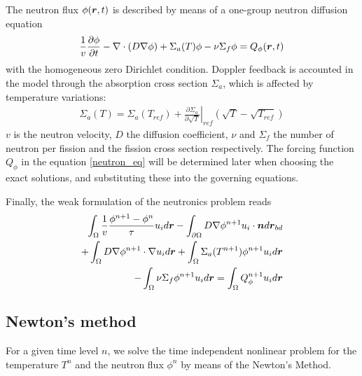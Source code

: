 The neutron flux $\phi(\boldsymbol{r},t)$ is described by means of a  one-group neutron diffusion equation
\begin{align}
  \frac{1}{v} \frac{\partial\phi}{\partial t} 
  - \nabla\cdot(D \nabla \phi) 
  + \Sigma_{a}(T) \phi 
  - \nu \Sigma_{f} \phi
  = Q_{\phi}(\boldsymbol{r},t) \label{neutron_eq}
\end{align}
%
with the homogeneous zero Dirichlet condition. Doppler feedback is accounted in the model through the absorption cross section $\Sigma_{a}$, which is affected by temperature variations:
\begin{align}
  \Sigma_{a}(T) = \Sigma_{a}(T_{ref}) 
  + \left. \frac{\partial \Sigma_{a}}{\partial \sqrt{T}}\right|_{ref} 
    \left( \sqrt{T} - \sqrt{T_{ref}} \right)
\end{align}
%
$v$ is the neutron velocity, $D$ the diffusion coefficient, $\nu$ and $\Sigma_{f}$ the number of neutron per fission and the fission cross section respectively.  The forcing function $Q_{\phi}$ in the equation \eqref{neutron_eq} will be determined later when choosing the exact solutions, and substituting these into the governing equations.

Finally, the weak formulation of the neutronics problem reads
\begin{align}
  \int_{\Omega} \frac{1}{v} \frac{\phi^{n+1}-\phi{^n}}{\tau} u_i d\boldsymbol{r} 
  - \int_{\partial\Omega} D \nabla \phi^{n+1} u_i \cdot \boldsymbol{n} d\boldsymbol{r}_{bd}& \nonumber \\
  + \int_{\Omega} D \nabla \phi^{n+1} \cdot \nabla u_i d\boldsymbol{r} 
  + \int_{\Omega} \Sigma_{a}(T^{n+1}) \phi^{n+1} u_i d\boldsymbol{r}& \nonumber \\
  - \int_{\Omega} \nu \Sigma_{f} \phi^{n+1} u_i d\boldsymbol{r} 
  = \int_{\Omega} Q_{\phi}^{n+1} u_i d\boldsymbol{r}&
\end{align}


\subsection*{Newton's method}
For a given time level $n$, we solve the time independent nonlinear problem for the temperature $T^{n}$ and the neutron flux $\phi^{n}$ by means of the Newton's Method.

